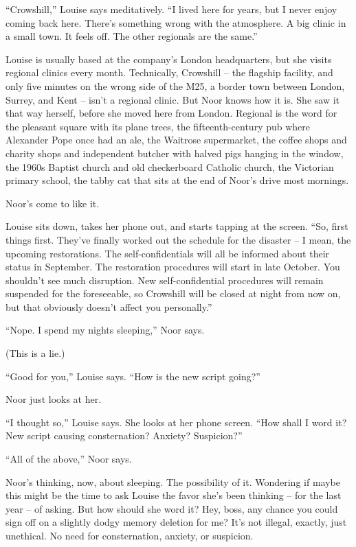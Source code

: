 \documentclass[12pt,a5paper]{book}
\newcommand{\qm}[1]{“#1”}
\begin{document}
\qm{Crowshill,} Louise says meditatively. \qm{I lived here for years, but I never enjoy coming back here. There's something wrong with the atmosphere. A big clinic in a small town. It feels off. The other regionals are the same.}

Louise is usually based at the company's London headquarters, but she visits regional clinics every month. Technically, Crowshill – the flagship facility, and only five minutes on the wrong side of the M25, a border town between London, Surrey, and Kent – isn't a regional clinic. But Noor knows how it is. She saw it that way herself, before she moved here from London. Regional is the word for the pleasant square with its plane trees, the fifteenth-century pub where Alexander Pope once had an ale, the Waitrose supermarket, the coffee shops and charity shops and independent butcher with halved pigs hanging in the window, the 1960s Baptist church and old checkerboard Catholic church, the Victorian primary school, the tabby cat that sits at the end of Noor's drive most mornings.

Noor's come to like it.

Louise sits down, takes her phone out, and starts tapping at the screen. \qm{So, first things first. They've finally worked out the schedule for the disaster – I mean, the upcoming restorations. The self-confidentials will all be informed about their status in September. The restoration procedures will start in late October. You shouldn't see much disruption. New self-confidential procedures will remain suspended for the foreseeable, so Crowshill will be closed at night from now on, but that obviously doesn't affect you personally.}

\qm{Nope. I spend my nights sleeping,} Noor says.

(This is a lie.)

\qm{Good for you,} Louise says. \qm{How is the new script going?}

Noor just looks at her.

\qm{I thought so,} Louise says. She looks at her phone screen. \qm{How shall I word it? New script causing consternation? Anxiety? Suspicion?}

\qm{All of the above,} Noor says.

Noor's thinking, now, about sleeping. The possibility of it. Wondering if maybe this might be the time to ask Louise the favor she's been thinking – for the last year – of asking. But how should she word it? Hey, boss, any chance you could sign off on a slightly dodgy memory deletion for me? It's not illegal, exactly, just unethical. No need for consternation, anxiety, or suspicion.
\end{document}
